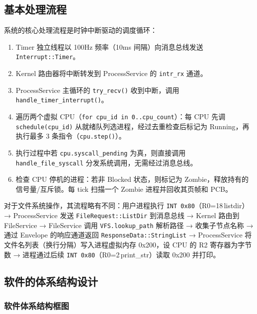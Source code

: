 \documentclass[UTF8,a4paper,12pt]{ctexart}
\begin{document}
\subsection{基本处理流程}

系统的核心处理流程是时钟中断驱动的调度循环：

\begin{enumerate}[label=(\arabic*)]
    \item Timer 独立线程以 100Hz 频率（10ms 间隔）向消息总线发送 \texttt{Interrupt::Timer}。
    \item Kernel 路由器将中断转发到 ProcessService 的 \texttt{intr\_rx} 通道。
    \item ProcessService 主循环的 \texttt{try\_recv()} 收到中断，调用 \texttt{handle\_timer\_interrupt()}。
    \item 遍历两个虚拟 CPU（\texttt{for cpu\_id in 0..cpu\_count}）：每 CPU 先调 \texttt{schedule(cpu\_id)} 从就绪队列选进程，经过去重检查后标记为 Running，再执行最多 3 条指令（\texttt{cpu.step()}）。
    \item 执行过程中若 \texttt{cpu.syscall\_pending} 为真，则直接调用 \texttt{handle\_file\_syscall} 分发系统调用，无需经过消息总线。
    \item 检查 CPU 停机的进程：若非 Blocked 状态，则标记为 Zombie，释放持有的信号量/互斥锁。每 tick 扫描一个 Zombie 进程并回收其页帧和 PCB。
\end{enumerate}

对于文件系统操作，其流程略有不同：用户进程执行 \texttt{INT 0x80}（R0=18\,listdir）→ ProcessService 发送 \texttt{FileRequest::ListDir} 到消息总线 → Kernel 路由到 FileService → FileService 调用 \texttt{VFS.lookup\_path} 解析路径 → 收集子节点名称 → 通过 Envelope 的响应通道返回 \texttt{ResponseData::StringList} → ProcessService 将文件名列表（换行分隔）写入进程虚拟内存 0x200，设 CPU 的 R2 寄存器为字节数 → 进程通过后续 \texttt{INT 0x80}（R0=2\,print\_str）读取 0x200 并打印。
\subsection{软件的体系结构设计}

\subsubsection{软件体系结构框图}
\end{document}

